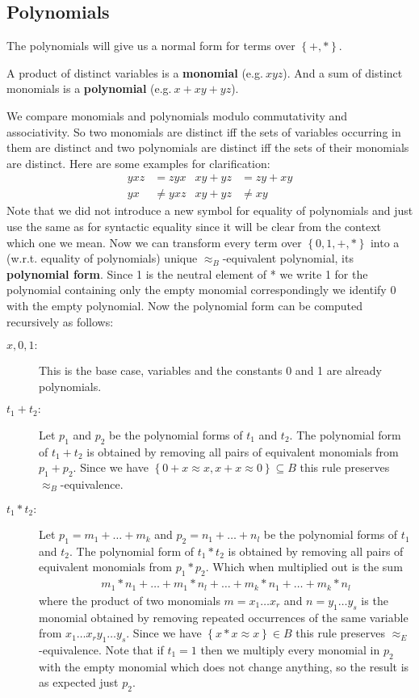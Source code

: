 	\subsection{Polynomials}
	The polynomials will give us a normal form for terms over $\left\lbrace +,*\right\rbrace $.
	\begin{definition}
		A product of distinct variables is a \textbf{monomial} (e.g.$\ xyz$). And a sum of distinct monomials is a \textbf{polynomial} (e.g.$\ x+xy+yz$).
	\end{definition}
	We compare monomials and polynomials modulo commutativity and associativity. So two monomials are distinct iff the sets of variables occurring in them are distinct and two polynomials are distinct iff the sets of their monomials are distinct.
	Here are some examples for clarification:
	\begin{align*}
		yxz & =zyx     & xy+yz & =zy+xy\\
		yx  & \neq yxz & xy+yz & \neq xy 
	\end{align*}
	Note that we did not introduce a new symbol for equality of polynomials and just use the same as for syntactic equality since it will be clear from the context which one we mean. Now we can transform every term over $\left\lbrace 0,1,+,*\right\rbrace$ 
	 into a (w.r.t. equality of polynomials) unique $\approx_B$-equivalent polynomial, its \textbf{polynomial form}. Since 1 is the neutral element of * we write 1 for the polynomial containing only the empty monomial correspondingly we identify 0 with the empty polynomial. Now the polynomial form can be computed recursively as follows:
	\begin{description}
		\item[$x,0,1:$] This is the base case, variables and the constants 0 and 1 are already polynomials.
		\item[$t_1+t_2:$] Let $p_1$ and $p_2$ be the polynomial forms of $t_1$ and $t_2$. The polynomial form of $t_1+t_2$ is obtained by removing all pairs of equivalent monomials from $p_1+p_2$. Since we have $\left\lbrace0+x\approx x,x+x\approx0\right\rbrace\subseteq B$  this rule preserves $\approx_B$-equivalence.
		\item[$t_1*t_2:$]  Let $p_1=m_1+\dots+m_k$ and $p_2=n_1+\dots+n_l$ be the polynomial forms of $t_1$ and $t_2$. The polynomial form of $t_1*t_2$ is obtained by removing all pairs of equivalent monomials from $p_1*p_2$. Which when multiplied out is the sum
		\begin{align*}
			m_1*n_1+\dots+m_1*n_l+\dots+m_k*n_1+\dots+m_k*n_l 
		\end{align*} 
		where the product of two monomials $m=x_1\dots x_r$ and $n=y_1\dots y_s$ is the monomial obtained by removing repeated occurrences of the same variable from $x_1\dots x_r y_1\dots y_s$. Since we have $\left\lbrace x*x\approx x\right\rbrace\in B$  this rule preserves $\approx_E$-equivalence. Note that if $t_1=1$ then we multiply every monomial in $p_2$ with the empty monomial which does not change anything, so the result is as expected just $p_2$.
	\end{description}

